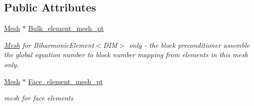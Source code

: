 \subsection*{Public Attributes}
\begin{DoxyCompactItemize}
\item 
\hyperlink{classoomph_1_1Mesh}{Mesh} $\ast$ \hyperlink{classoomph_1_1BiharmonicProblem_a62b9e4a4040c57379423acf04145ba78}{Bulk\+\_\+element\+\_\+mesh\+\_\+pt}
\begin{DoxyCompactList}\small\item\em \hyperlink{classoomph_1_1Mesh}{Mesh} for Biharmonic\+Element$<$\+D\+I\+M$>$ only -\/ the block preconditioner assemble the global equation number to block number mapping from elements in this mesh only. \end{DoxyCompactList}\item 
\hyperlink{classoomph_1_1Mesh}{Mesh} $\ast$ \hyperlink{classoomph_1_1BiharmonicProblem_af5ca1abca1c8ad4d56822d643c33cdd8}{Face\+\_\+element\+\_\+mesh\+\_\+pt}
\begin{DoxyCompactList}\small\item\em mesh for face elements \end{DoxyCompactList}\end{DoxyCompactItemize}
